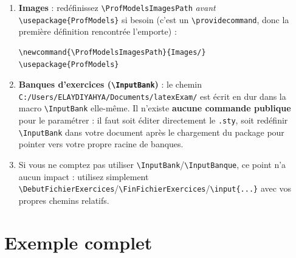 \documentclass[11pt,a4paper]{article}
\newcommand{\cmdname}[1]{\texttt{\textbackslash#1}}
\begin{document}
\begin{enumerate}
  \item \textbf{Images} : redéfinissez \cmdname{ProfModelsImagesPath} \textit{avant} \texttt{\textbackslash usepackage\{ProfModels\}} si besoin (c'est un \texttt{\textbackslash providecommand}, donc la première définition rencontrée l'emporte) :
\begin{lstlisting}
\newcommand{\ProfModelsImagesPath}{Images/}
\usepackage{ProfModels}
\end{lstlisting}
  \item \textbf{Banques d'exercices (\cmdname{InputBank})} : le chemin \texttt{C:/Users/ELAYDIYAHYA/Documents/latexExam/} est écrit en dur dans la macro \cmdname{InputBank} elle-même. Il n'existe \textbf{aucune commande publique} pour le paramétrer : il faut soit éditer directement le \texttt{.sty}, soit redéfinir \cmdname{InputBank} dans votre document après le chargement du package pour pointer vers votre propre racine de banques.
  \item Si vous ne comptez pas utiliser \cmdname{InputBank}/\cmdname{InputBanque}, ce point n'a aucun impact : utilisez simplement \cmdname{DebutFichierExercices}/\cmdname{FinFichierExercices}/\texttt{\textbackslash input\{...\}} avec vos propres chemins relatifs.
\end{enumerate}

\section{Exemple complet}
\end{document}
